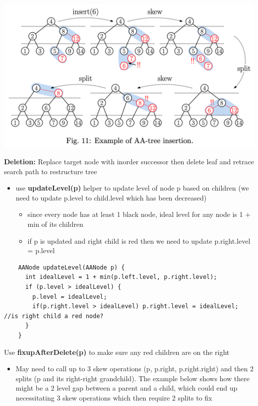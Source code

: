 \documentclass{article}
\begin{document}
  \begin{center}
  \includegraphics[scale=0.2]{InsertionAATree}
  \end{center}
  \textbf{Deletion: }Replace target node with inorder successor then delete leaf and retrace search path to restructure tree
  \begin{itemize}[noitemsep]
    \item use \textbf{updateLevel(p)} helper to update level of node p based on children (we need to update p.level to child.level which has been decreased)
    \begin{itemize}[noitemsep]
      \item since every node has at least 1 black node, ideal level for any node is 1 + min of its children 
      \item if p is updated and right child is red then we need to update p.right.level = p.level
    \end{itemize}
  \end{itemize}
  \begin{lstlisting}
    AANode updateLevel(AANode p) {
      int idealLevel = 1 + min(p.left.level, p.right.level);
      if (p.level > idealLevel) {
        p.level = idealLevel;
        if(p.right.level > idealLevel) p.right.level = idealLevel;  //is right child a red node?
      }
    } 
  \end{lstlisting}
  Use \textbf{fixupAfterDelete(p)} to make sure any red children are on the right
  \begin{itemize}[noitemsep]
  \item May need to call up to 3 skew operations (p, p.right, p.right.right) and then 2 splits (p and its right-right grandchild). The example below shows how there might be a 2 level gap between a parent and a child, which could end up necessitating 3 skew operations which then require 2 splits to fix
  \end{itemize}
\end{document}
